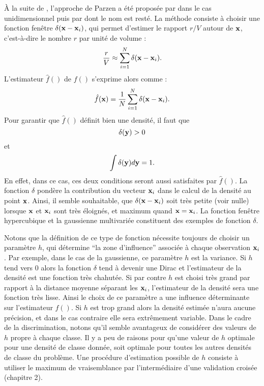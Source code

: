 \`A la suite de , l'approche de Parzen a \'et\'e propos\'ee 
par  dans
le cas unidimensionnel puis par  dont le
nom est rest\'e. La m\'ethode consiste \`a choisir une fonction fen\^etre $\delta(\mbox{\bf x}-\mbox{\bf x}_i)$,
qui permet d'estimer le rapport $r/V$ autour de $\mbox{\bf x}$, c'est-\`a-dire le
nombre $r$ par unit\'e de volume :
$$
\frac{r}{V}\approx \sum_{i=1}^{N} \delta(\mbox{\bf x}-\mbox{\bf x}_i).
$$
L'estimateur $\hat{f}()$ de $f()$ s'exprime alors comme :
$$
\hat{f}(\mbox{\bf x})=\frac{1}{N} \sum_{i=1}^{N} \delta(\mbox{\bf x}-\mbox{\bf x}_i).
$$
Pour garantir que $\hat{f}()$ d\'efinit bien une densit\'e, il faut que 
$$
\delta(\mbox{\bf y})>0
$$
et
$$
\int \delta(\mbox{\bf y})d\mbox{\bf y}=1.
$$
En effet, dans ce cas, ces deux conditions seront aussi satisfaites par $\hat{f}()$.
La fonction $\delta$ pond\`ere la contribution du vecteur $\mbox{\bf x}_i$ dans 
le calcul de la densit\'e au point $\mbox{\bf x}$. Ainsi, il semble souhaitable, que
$\delta(\mbox{\bf x}-\mbox{\bf x}_i)$ soit tr\`es petite (voir nulle) lorsque $\mbox{\bf x}$ et $\mbox{\bf x}_i$ 
sont tr\`es \'eloign\'es, et maximum quand $\mbox{\bf x}=\mbox{\bf x}_i$. La fonction fen\^etre
hypercubique et la gaussienne multivari\'ee constituent des exemples
de fonction $\delta$.

Notons que la d\'efinition de ce type de fonction n\'ecessite toujours de choisir
un param\`etre $h$, qui d\'etermine ``la zone d'influence''  associ\'ee \`a chaque
observation $\mbox{\bf x}_i$. Par exemple, dans le cas de la gaussienne, ce param\`etre 
$h$ est la variance. Si $h$ tend vers $0$ alors la fonction $\delta$ tend \`a devenir
une Dirac et l'estimateur de la densit\'e est une fonction tr\`es chahut\'ee. Si par
contre $h$ est choisi tr\`es grand par rapport \`a la distance moyenne 
s\'eparant les $\mbox{\bf x}_i$, l'estimateur de la densit\'e sera une fonction tr\`es
lisse.  Ainsi le choix de ce param\`etre a une influence d\'eterminante sur
l'estimateur $\hat{f}()$. Si $h$ est trop grand alors la densit\'e estim\'ee
n'aura aucune pr\'ecision, et dans le cas contraire elle sera extr\^emement
variable. Dans le cadre de la discrimination, notons qu'il semble avantageux 
de consid\'erer des valeurs de $h$ propre \`a chaque classe. Il y a peu de 
raisons pour qu'une valeur de $h$ optimale
pour une densit\'e de classe donn\'ee, soit optimale pour toutes les autres densit\'es
de classe du probl\`eme. Une proc\'edure d'estimation possible de $h$ consiste \`a utiliser le
maximum de vraisemblance par l'interm\'ediaire d'une validation crois\'ee (chapitre 2).    


